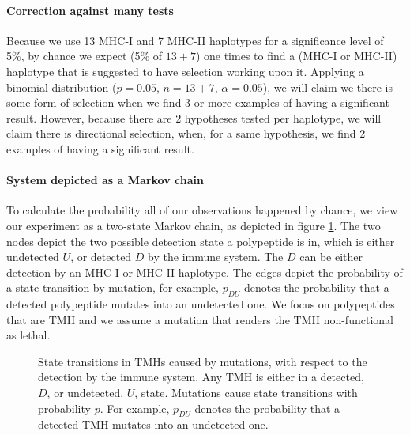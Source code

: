 \documentclass{article}
\begin{document}
\paragraph{Correction against many tests}

Because we use 13 MHC-I and 7 MHC-II haplotypes
for a significance level of 5\%, by chance we expect (5\% of $13 + 7$)
one times to find a (MHC-I or MHC-II) haplotype 
that is suggested to have selection working upon it.
Applying a binomial distribution ($p = 0.05$, $n = 13+7$, $\alpha = 0.05$),
we will claim we there is some form of selection when we find 3
or more examples of having a significant result.
However, because there are 2 hypotheses tested per haplotype,
we will claim there is directional selection, 
when, for a same hypothesis, we find 2 examples of having a significant result.

%

\paragraph{System depicted as a Markov chain}
 
To calculate the probability all of our observations happened by chance,
we view our experiment as a two-state Markov chain, as depicted in
figure \ref{fig:markov_chain}. The two nodes depict the
two possible detection state a polypeptide is in, which is
either undetected $U$, or detected $D$ by the immune system.
The $D$ can be either detection by an MHC-I or MHC-II haplotype.
The edges depict the probability of a state transition by mutation,
for example, $p_{DU}$ denotes the probability that a detected
polypeptide mutates into an undetected one.
We focus on polypeptides that are TMH and we assume a mutation that 
renders the TMH non-functional as lethal.

\begin{figure}
  \centering
  
  \caption{
    State transitions in TMHs caused by mutations, with respect to the
    detection by the immune system. Any TMH is either in a detected, $D$, or
    undetected, $U$, state. Mutations cause state transitions with probability
    $p$. For example, $p_{DU}$ denotes the probability that a detected
    TMH mutates into an undetected one.
  }
  \label{fig:markov_chain}
\end{figure}
\end{document}

